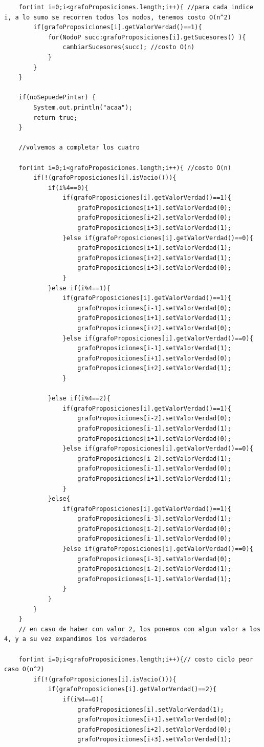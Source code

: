 \documentclass[a4paper]{article}
\begin{document}
\begin{lstlisting}
	for(int i=0;i<grafoProposiciones.length;i++){ //para cada indice i, a lo sumo se recorren todos los nodos, tenemos costo O(n^2)
		if(grafoProposiciones[i].getValorVerdad()==1){
			for(NodoP succ:grafoProposiciones[i].getSucesores() ){
				cambiarSucesores(succ); //costo O(n)
			}
		}
	}
	
	if(noSepuedePintar) {
		System.out.println("acaa");
		return true;
	}
	
	//volvemos a completar los cuatro

	for(int i=0;i<grafoProposiciones.length;i++){ //costo O(n)
		if(!(grafoProposiciones[i].isVacio())){
			if(i%4==0){
				if(grafoProposiciones[i].getValorVerdad()==1){
					grafoProposiciones[i+1].setValorVerdad(0);
					grafoProposiciones[i+2].setValorVerdad(0);
					grafoProposiciones[i+3].setValorVerdad(1);
				}else if(grafoProposiciones[i].getValorVerdad()==0){
					grafoProposiciones[i+1].setValorVerdad(1);
					grafoProposiciones[i+2].setValorVerdad(1);
					grafoProposiciones[i+3].setValorVerdad(0);
				}
			}else if(i%4==1){
				if(grafoProposiciones[i].getValorVerdad()==1){
					grafoProposiciones[i-1].setValorVerdad(0);
					grafoProposiciones[i+1].setValorVerdad(1);
					grafoProposiciones[i+2].setValorVerdad(0);
				}else if(grafoProposiciones[i].getValorVerdad()==0){
					grafoProposiciones[i-1].setValorVerdad(1);
					grafoProposiciones[i+1].setValorVerdad(0);
					grafoProposiciones[i+2].setValorVerdad(1);
				}
				
			}else if(i%4==2){
				if(grafoProposiciones[i].getValorVerdad()==1){
					grafoProposiciones[i-2].setValorVerdad(0);
					grafoProposiciones[i-1].setValorVerdad(1);
					grafoProposiciones[i+1].setValorVerdad(0);
				}else if(grafoProposiciones[i].getValorVerdad()==0){
					grafoProposiciones[i-2].setValorVerdad(1);
					grafoProposiciones[i-1].setValorVerdad(0);
					grafoProposiciones[i+1].setValorVerdad(1);
				}
			}else{
				if(grafoProposiciones[i].getValorVerdad()==1){
					grafoProposiciones[i-3].setValorVerdad(1);
					grafoProposiciones[i-2].setValorVerdad(0);
					grafoProposiciones[i-1].setValorVerdad(0);
				}else if(grafoProposiciones[i].getValorVerdad()==0){
					grafoProposiciones[i-3].setValorVerdad(0);
					grafoProposiciones[i-2].setValorVerdad(1);
					grafoProposiciones[i-1].setValorVerdad(1);
				}
			}
		}
	}		
	// en caso de haber con valor 2, los ponemos con algun valor a los 4, y a su vez expandimos los verdaderos

	for(int i=0;i<grafoProposiciones.length;i++){// costo ciclo peor caso O(n^2)
		if(!(grafoProposiciones[i].isVacio())){
			if(grafoProposiciones[i].getValorVerdad()==2){
				if(i%4==0){
					grafoProposiciones[i].setValorVerdad(1);
					grafoProposiciones[i+1].setValorVerdad(0);
					grafoProposiciones[i+2].setValorVerdad(0);
					grafoProposiciones[i+3].setValorVerdad(1);
					

\end{lstlisting}
\end{document}
